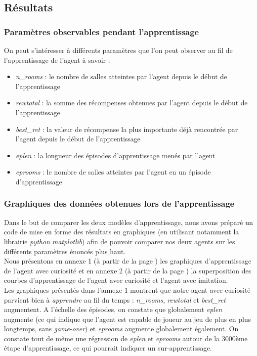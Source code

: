\documentclass[a4paper,12pt]{report}
\begin{document}
\subsection{Résultats}
\subsubsection{Paramètres observables pendant l'apprentissage}
On peut s'intéresser à différents paramètres que l'on peut observer au fil de l'apprentissage de l'agent à savoir :
\begin{itemize}
    \item \textit{n\_rooms} : le nombre de salles atteintes par l'agent depuis le début de l'apprentissage
    \item \textit{rewtotal} : la somme des récompenses obtenues par l'agent depuis le début de l'apprentissage
    \item \textit{best\_ret} : la valeur de récompense la plus importante déjà rencontrée par l'agent depuis le début de l'apprentissage
    \item \textit{eplen} : la longueur des épisodes d'apprentissage menés par l'agent
    \item \textit{eprooms} : le nombre de salles atteintes par l'agent en un épisode d'apprentissage
\end{itemize}

\subsubsection{Graphiques des données obtenues lors de l'apprentissage}
\indent Dans le but de comparer les deux modèles d'apprentissage, nous avons préparé un code de mise en forme des résultats en graphiques (en utilisant notamment la librairie \textit{python} \textit{matplotlib}) afin de pouvoir comparer nos deux agents sur les différents paramètres énoncés plus haut.\\

\indent Nous présentons en annexe 1 (à partir de la page \pageref{annexe_1}) les graphiques d'apprentissage de l'agent avec curiosité et en annexe 2 (à partir de la page \pageref{annexe_2}) la superposition des courbes d'apprentissage de l'agent avec curiosité et l'agent avec imitation.\\

\indent Les graphiques présentés dans l'annexe 1 montrent que notre agent avec curiosité parvient bien à \textit{apprendre} au fil du temps : \textit{n\_rooms}, \textit{rewtotal} et \textit{best\_ret} augmentent. A l'échelle des épisodes, on constate que globalement \textit{eplen} augmente (ce qui indique que l'agent est capable de joueur au jeu de plus en plus longtemps, sans \textit{game-over}) et \textit{eprooms} augmente globalement également. On constate tout de même une régression de \textit{eplen} et \textit{eprooms} autour de la 3000ème étape d'apprentissage, ce qui pourrait indiquer un sur-apprentissage.\\
\end{document}
